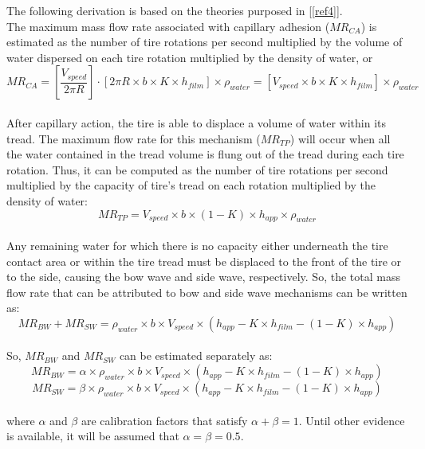 \documentclass[12pt]{article}
\newcommand{\reref}[1]{\ref{#1}}
\begin{document}
The following derivation is based on the theories purposed in [\reref{ref4}].\\
The maximum mass flow rate associated with capillary adhesion ($\mathit{MR_{CA}}$) is estimated as the number of tire rotations per second multiplied by the volume of water dispersed on each tire rotation multiplied by the density of water, or
 \[ 
\mathit{MR_{CA}} = \left[\frac{V_{speed}}{2\pi R}\right] \cdot \left[ 2\pi R \times b \times K \times h_{film} \right] \times \rho_{water} = \left[V_{speed} \times b \times K \times h_{film} \right] \times  \rho_{water} 
\]
\\
After capillary action, the tire is able to displace a volume of water within its tread. The maximum flow rate for this mechanism ($MR_{TP}$) will occur when all the water contained in the tread volume is flung out of the tread during each tire rotation. Thus, it can be computed as the number of tire rotations per second multiplied by the capacity of tire’s tread on each rotation multiplied by the density of water:
 \[ 
\mathit{MR_{TP}} = V_{speed} \times b \times (1-K) \times h_{app} \times \rho_{water} 
\]
\\
Any remaining water for which there is no capacity either underneath the tire contact area or within the tire tread must be displaced to the front of the tire or to the side, causing the bow wave and side wave, respectively. So, the total mass flow rate that can be attributed to bow and side wave mechanisms can be written as:
 \[ 
\mathit{MR_{BW} + MR_{SW}} =  \rho_{water} \times b \times V_{speed} \times (h_{app} - K \times h_{film} - (1-K) \times h_{app}) \]
\\
So, $\mathit{MR_{BW}}$ and $\mathit{MR_{SW}}$ can be estimated separately as:
 \[ 
\mathit{MR_{BW}} =  \alpha \times \rho_{water} \times b \times V_{speed} \times (h_{app} - K \times h_{film} - (1-K) \times h_{app}) \]
 \[
\mathit{MR_{SW}} = \beta \times \rho_{water} \times b \times V_{speed} \times (h_{app} - K \times h_{film} - (1-K) \times h_{app}) \]
\\
where $\alpha$ and $\beta$ are calibration factors that satisfy $\alpha + \beta = 1$. Until other evidence is available, it will be assumed that $\alpha = \beta = 0.5$.
\end{document}
